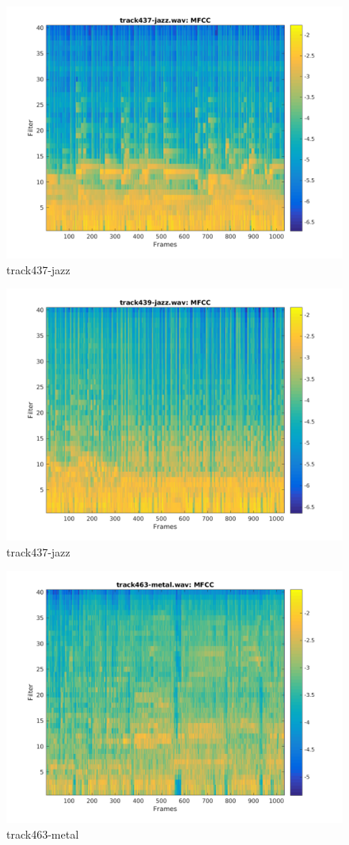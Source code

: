 \documentclass[11pt, a4paper]{article}
\begin{document}
\begin{figure}[H]
    \centering
    \includegraphics[width=.8\textwidth]{track437-jazz-mfcc.png}
    \caption{track437-jazz}
\end{figure}


\begin{figure}[H]
    \centering
    \includegraphics[width=.8\textwidth]{track439-jazz-mfcc.png}
    \caption{track437-jazz}
\end{figure}


\begin{figure}[H]
    \centering
    \includegraphics[width=.8\textwidth]{track463-metal-mfcc.png}
    \caption{track463-metal}
\end{figure}
\end{document}
